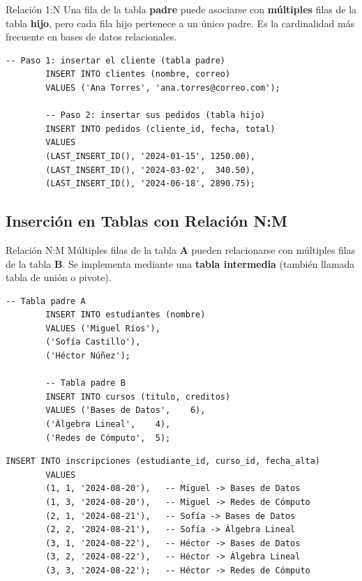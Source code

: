 \documentclass[12pt, a4paper]{article}
\begin{document}
	\begin{definicion}{Relación 1:N}
		Una fila de la tabla \textbf{padre} puede asociarse con \textbf{múltiples}
		filas de la tabla \textbf{hijo}, pero cada fila hijo pertenece a un único
		padre. Es la cardinalidad más frecuente en bases de datos relacionales.
	\end{definicion}
	
	\begin{lstlisting}[style=sql, caption={Inserción 1:N — un cliente con varios pedidos}]
		-- Paso 1: insertar el cliente (tabla padre)
		INSERT INTO clientes (nombre, correo)
		VALUES ('Ana Torres', 'ana.torres@correo.com');
		
		-- Paso 2: insertar sus pedidos (tabla hijo)
		INSERT INTO pedidos (cliente_id, fecha, total)
		VALUES
		(LAST_INSERT_ID(), '2024-01-15', 1250.00),
		(LAST_INSERT_ID(), '2024-03-02',  340.50),
		(LAST_INSERT_ID(), '2024-06-18', 2890.75);
	\end{lstlisting}
	
	\subsection{Inserción en Tablas con Relación N:M}
	
	\begin{definicion}{Relación N:M}
		Múltiples filas de la tabla \textbf{A} pueden relacionarse con múltiples
		filas de la tabla \textbf{B}. Se implementa mediante una
		\textbf{tabla intermedia} (también llamada tabla de unión o pivote).
	\end{definicion}
	
	\begin{lstlisting}[style=sql, caption={Paso 1 — poblar ambas tablas padre}]
		-- Tabla padre A
		INSERT INTO estudiantes (nombre)
		VALUES ('Miguel Ríos'),
		('Sofía Castillo'),
		('Héctor Núñez');
		
		-- Tabla padre B
		INSERT INTO cursos (titulo, creditos)
		VALUES ('Bases de Datos',    6),
		('Álgebra Lineal',    4),
		('Redes de Cómputo',  5);
	\end{lstlisting}
	
	\begin{lstlisting}[style=sql, caption={Paso 2 — insertar en la tabla intermedia}]
		INSERT INTO inscripciones (estudiante_id, curso_id, fecha_alta)
		VALUES
		(1, 1, '2024-08-20'),   -- Miguel -> Bases de Datos
		(1, 3, '2024-08-20'),   -- Miguel -> Redes de Cómputo
		(2, 1, '2024-08-21'),   -- Sofía -> Bases de Datos
		(2, 2, '2024-08-21'),   -- Sofía -> Álgebra Lineal
		(3, 1, '2024-08-22'),   -- Héctor -> Bases de Datos
		(3, 2, '2024-08-22'),   -- Héctor -> Álgebra Lineal
		(3, 3, '2024-08-22');   -- Héctor -> Redes de Cómputo
	\end{lstlisting}
	
\end{document}
